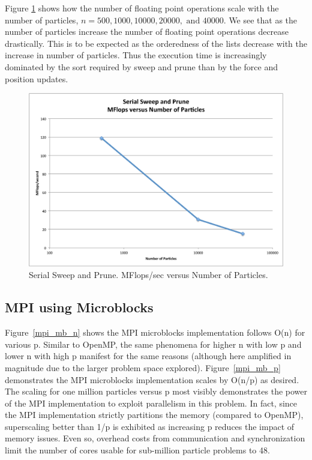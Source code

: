 \documentclass[11pt]{article} %
\begin{document}
Figure \ref{plot:serial_flops_v_n} shows how the number of floating
point operations scale with the number of particles, $n=500,1000,10000,20000,\text{ and }40000$.
We see that as the number of particles increase the number of floating
point operations decrease drastically. This is to be expected as the
orderedness of the lists decrease with the increase in number of particles.
Thus the execution time is increasingly dominated by the sort required
by sweep and prune than by the force and position updates.

\begin{figure}
\begin{centering}
\includegraphics[width=0.5\paperwidth]{figures/serial_flops_v_n}
\par\end{centering}

\caption{Serial Sweep and Prune. MFlops/sec versus Number of Particles.}
\label{plot:serial_flops_v_n}
\end{figure}


\subsection{MPI using Microblocks}

Figure~\ref{mpi_mb_n} shows the MPI microblocks implementation follows O(n) for various p. Similar to OpenMP, the same phenomena for higher n with low p and lower n with high p manifest for the same reasons (although here amplified in magnitude due to the larger problem space explored). Figure~\ref{mpi_mb_p} demonstrates the MPI microblocks implementation scales by O(n/p) as desired. The scaling for one million particles versus p most visibly demonstrates the power of the MPI implementation to exploit parallelism in this problem. In fact, since the MPI implementation strictly partitions the memory (compared to OpenMP), superscaling better than 1/p is exhibited as increasing p reduces the impact of memory issues. Even so, overhead costs from communication and synchronization limit the number of cores usable for sub-million particle problems to 48.
\end{document}
